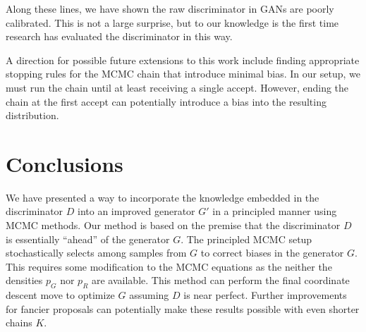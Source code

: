 \documentclass{article}
\newcommand{\PG}{{p_G}}
\newcommand{\PR}{{p_R}}
\begin{document}
Along these lines, we have shown the raw discriminator in GANs are poorly calibrated.
This is not a large surprise, but to our knowledge is the first time research has evaluated the discriminator in this way.

A direction for possible future extensions to this work include finding appropriate stopping rules for the MCMC chain that introduce minimal bias.
In our setup, we must run the chain until at least receiving a single accept.
However, ending the chain at the first accept can potentially introduce a bias into the resulting distribution.

\section{Conclusions}

We have presented a way to incorporate the knowledge embedded in the discriminator $D$ into an improved generator $G'$ in a principled manner using MCMC methods.
Our method is based on the premise that the discriminator $D$ is essentially ``ahead'' of the generator $G$.
The principled MCMC setup stochastically selects among samples from $G$ to correct biases in the generator $G$.
This requires some modification to the MCMC equations as the neither the densities $\PG$ nor $\PR$ are available.
This method can perform the final coordinate descent move to optimize $G$ assuming $D$ is near perfect.
Further improvements for fancier proposals can potentially make these results possible with even shorter chains $K$.


\end{document}
